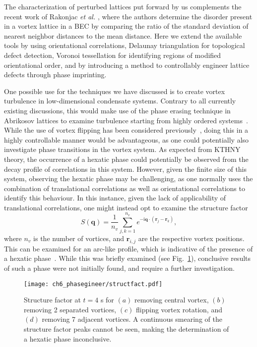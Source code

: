 The characterization of perturbed lattices put forward by us complements the recent work of Rakonjac \textit{et al.} \cite{VTX:Rankonjac_pra_2016}, where the authors determine the disorder present in a vortex lattice in a BEC by comparing the ratio of the standard deviation of nearest neighbor distances to the mean distance. Here we extend the available tools by using orientational correlations, Delaunay triangulation for topological defect detection, Voronoi tessellation for identifying regions of modified orientational order, and by introducing a method to controllably engineer lattice defects through phase imprinting.

One possible use for the techniques we have discussed is to create vortex turbulence in low-dimensional condensate systems. Contrary to all currently existing discussions, this would make use of the phase erasing technique in Abrikosov lattices to examine turbulence starting from highly ordered systems~\cite{VTX:Neely_prl_2013,VTX:Kwon_pra_2014,VTX:Groszek_pra_2016}. While the use of vortex flipping has been considered previously~\cite{VTX:Madarassy_gfd_2009}, doing this in a highly controllable manner would be advantageous, as one could potentially also investigate phase transitions in the vortex system. As expected from KTHNY theory, the occurrence of a hexatic phase could potentially be observed from the decay profile of correlations in this system. However, given the finite size of this system, observing the hexatic phase may be challenging, as one normally uses the combination of translational correlations as well as orientational correlations to identify this behaviour. In this instance, given the lack of applicability of translational correlations, one might instead opt to examine the structure factor \[S(\mathbf{q}) = \frac{1}{n_v}\displaystyle\sum\limits_{j,k=1}^{n_v} e^{-\textrm{i}\mathbf{q}\cdot(\mathbf{r}_j - \mathbf{r}_k)},\] where $n_v$ is the number of vortices, and $\mathbf{r}_{i,j}$ are the respective vortex positions. This can be examined for an arc-like profile, which is indicative of the presence of a hexatic phase~\cite{CM:Brodin_cmp_2010,CM:Sun_scirep_2016}. While this was briefly examined (see Fig.~\ref{fig:struct_fact}), conclusive results of such a phase were not initially found, and require a further investigation.

\begin{figure}\centering
    \texttt{[image: ch6\_phasegineer/structfact.pdf]}
    \caption{Structure factor at $t=4$ s for $(a)$ removing central vortex, $(b)$ removing 2 separated vortices, $(c)$ flipping vortex rotation, and $(d)$ removing 7 adjacent vortices. A continuous smearing of the structure factor peaks cannot be seen, making the determination of a hexatic phase inconclusive.}\label{fig:struct_fact}
\end{figure}
